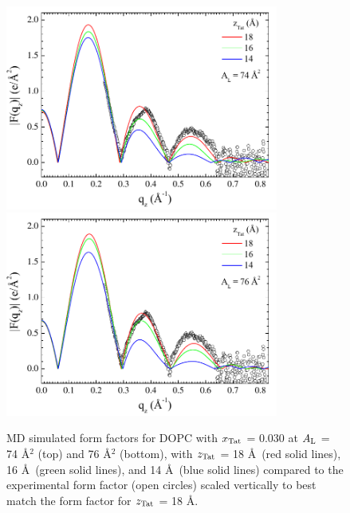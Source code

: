 \begin{figure}[p]
  \centering
  \includegraphics[width=0.8\textwidth]{figures/Tat/MD_Results/xff/dopc-tat4_74_sim-exp1}
  \includegraphics[width=0.8\textwidth]{figures/Tat/MD_Results/xff/dopc-tat4_76_sim-exp1}
  \caption[MD simulated form factors for DOPC with $\xTat$ = 0.030 
  at $\AL$ = 74 \AA$^2$ (top) and 76 \AA$^2$ (bottom),
  with $\zTat$ = 18 \AA\ (red solid lines), 16 \AA\ (green solid lines), 
  and 14 \AA\ (blue solid lines) compared to the experimental form factor 
  (open circles) scaled vertically to best match the form factor for 
  $\zTat$ = 18 \AA]
  {MD simulated form factors for DOPC with $\xTat$ = 0.030 
  at $\AL$ = 74 \AA$^2$ (top) and 76 \AA$^2$ (bottom),
  with $\zTat$ = 18 \AA\ (red solid lines), 16 \AA\ (green solid lines), 
  and 14 \AA\ (blue solid lines) compared to the experimental form factor 
  (open circles) scaled vertically to best match the form factor for 
  $\zTat$ = 18 \AA.}
  \label{fig:MD_dopc-tat4_sim-exp}
\end{figure}

